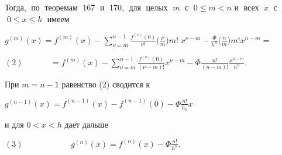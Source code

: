 Тогда,$\;$ по$\;$ теоремам$\;$ 167$\;$ и$\;$ 170,$\;$ для$\;$ целых $\;m\;$ с $\;0\leqslant m<n$
\newline
и$\;$ всех $\;x\;$ с $\;0\leqslant x\leqslant h\;$ имеем
\begin{center}$g^{(m)}(x)=f^{(m)}(x)-\sum\limits_{\nu=m}^{n-1}\frac{f^{(v)}(0)}{\nu!}\Big(\frac{\nu}{m}\Big)m!\;x^{\nu-m}-\frac{\Phi}{h^{n}}\Big(\frac{n}{m}\Big)m!x^{n-m}=$\end{center}
\begin{center}$(2)\;\;\;\;\;\;\;\;\;\;\;\;=f^{(m)}(x)-\sum\limits_{\nu=m}^{n-1}\frac{f^{(\nu)}(0)}{(\nu-m)!}x^{\nu-m}-\Phi\frac{n!}{(n-m)!}\frac{x^{n-m}}{h^n}.\;\;\;\;\;\;\;\;\;\;\;\;\;\;\;\;\;\;\;\;\;\;\;\;\;$\end{center}

При $m=n-1$ равенство (2) сводится к
\begin{center}$g^{(n-1)}(x)=f^{(n-1)}(x)-f^{(n-1)}(0)-\Phi\frac{n!}{h_n}x$\end{center}
и для $0<x<h$ дает дальше
\begin{center}
$(3)\;\;\;\;\;\;\;\;\;\;\;\;\;\;\;\;\;\;\;\;\;g^{(n)}(x)=f^{(n)}(x)-\Phi\frac{n!}{h^n}.\;\;\;\;\;\;\;\;\;\;\;\;\;\;\;\;\;\;\;\;\;\;\;\;\;\;\;\;\;\;\;\;\;\;\;\;\;\;\;\;\;\;\;\;\;$
\end{center}